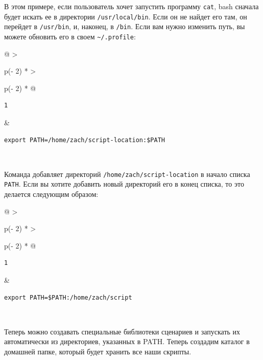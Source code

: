 \documentclass{report}
\begin{document}
В этом примере, если пользователь хочет запустить программу
\texttt{cat}, bash сначала будет искать ее в директории
\texttt{/usr/local/bin}. Если он не найдет его там, он перейдет в
\texttt{/usr/bin}, и, наконец, в \texttt{/bin}. Если вам нужно изменить
путь, вы можете обновить его в своем
\texttt{\textasciitilde{}/.profile}:

\begin{longtable}[]{@{}
  >{\raggedright\arraybackslash}p{(\columnwidth - 2\tabcolsep) * }
  >{\raggedright\arraybackslash}p{(\columnwidth - 2\tabcolsep) * }@{}}
\toprule
\endhead
\begin{minipage}[t]{\linewidth}\raggedright
\begin{verbatim}
1
\end{verbatim}
\end{minipage} & \begin{minipage}[t]{\linewidth}\raggedright
\begin{verbatim}
export PATH=/home/zach/script-location:$PATH
\end{verbatim}
\end{minipage} \\ \addlinespace
\bottomrule
\end{longtable}

Команда добавляет директорий \texttt{/home/zach/script-location} в
начало списка \texttt{PATH}. Если вы хотите добавить новый директорий
его в конец списка, то это делается следующим образом:

\begin{longtable}[]{@{}
  >{\raggedright\arraybackslash}p{(\columnwidth - 2\tabcolsep) * }
  >{\raggedright\arraybackslash}p{(\columnwidth - 2\tabcolsep) * }@{}}
\toprule
\endhead
\begin{minipage}[t]{\linewidth}\raggedright
\begin{verbatim}
1
\end{verbatim}
\end{minipage} & \begin{minipage}[t]{\linewidth}\raggedright
\begin{verbatim}
export PATH=$PATH:/home/zach/script
\end{verbatim}
\end{minipage} \\ \addlinespace
\bottomrule
\end{longtable}

Теперь можно создавать специальные библиотеки сценариев и запускать их
автоматически из директориев, указанных в PATH. Теперь создадим каталог
в домашней папке, который будет хранить все наши скрипты.
\end{document}
